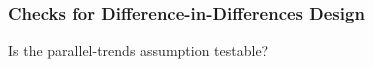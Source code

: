 \documentclass[xcolor=dvipsnames]{beamer}
\begin{document}

\begin{frame}
  \frametitle{Checks for Difference-in-Differences Design}

\begin{center}
 Is the parallel-trends assumption testable?
 \end{center}
 \end{frame}
  
\end{document}
